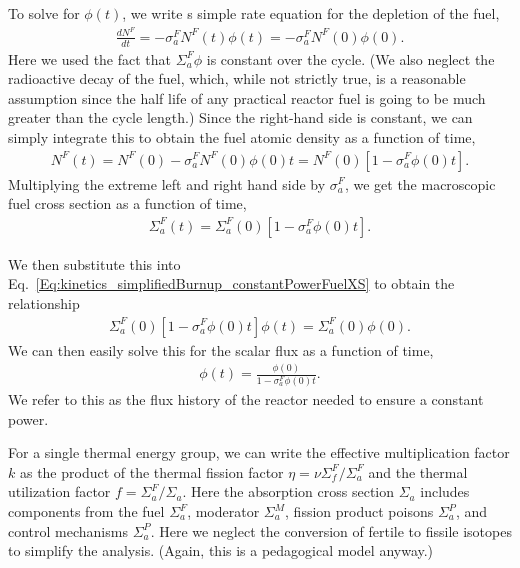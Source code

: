 To solve for $\phi(t)$, we write s simple rate equation for the depletion of the fuel,
\begin{align}
  \frac{dN^F}{dt} = -\sigma_a^F N^F(t) \phi(t) = -\sigma_a^F N^F(0) \phi(0) .
\end{align}
Here we used the fact that $\Sigma_a^F \phi$ is constant over the cycle. (We also neglect the radioactive decay of the fuel, which, while not strictly true, is a reasonable assumption since the half life of any practical reactor fuel is going to be much greater than the cycle length.) Since the right-hand side is constant, we can simply integrate this to obtain the fuel atomic density as a function of time,
\begin{align}
  N^F(t) = N^F(0) -\sigma_a^F N^F(0) \phi(0) t = N^F(0) \left[ 1 - \sigma_a^F \phi(0) t \right] .
\end{align}
Multiplying the extreme left and right hand side by $\sigma_a^F$, we get the macroscopic fuel cross section as a function of time,
\begin{align}
  \Sigma_a^F(t) = \Sigma_a^F(0) \left[ 1 - \sigma_a^F \phi(0) t \right] . \label{Eq:kinetics_simplifiedBurnup_fuelAbsorptionXS_time}
\end{align}

We then substitute this into Eq.~\eqref{Eq:kinetics_simplifiedBurnup_constantPowerFuelXS} to obtain the relationship
\begin{align}
  \Sigma_a^F(0) \left[ 1 - \sigma_a^F \phi(0) t \right] \phi(t) = \Sigma_a^F(0) \phi(0) . \nonumber
\end{align}
We can then easily solve this for the scalar flux as a function of time,
\begin{align}
  \phi(t) = \frac{\phi(0)}{ 1 - \sigma_a^F \phi(0) t } . \label{Eq:kinetics_simplifiedBurnup_scalarFlux_time}
\end{align}
We refer to this as the flux history of the reactor needed to ensure a constant power.

For a single thermal energy group, we can write the effective multiplication factor $k$ as the product of the thermal fission factor $\eta = \nu\Sigma_f^F/\Sigma_a^F$ and the thermal utilization factor $f = \Sigma_a^F/\Sigma_a$. Here the absorption cross section $\Sigma_a$ includes components from the fuel $\Sigma_a^F$, moderator $\Sigma_a^M$, fission product poisons $\Sigma_a^P$, and control mechanisms $\Sigma_a^P$. Here we neglect the conversion of fertile to fissile isotopes to simplify the analysis. (Again, this is a pedagogical model anyway.) 

